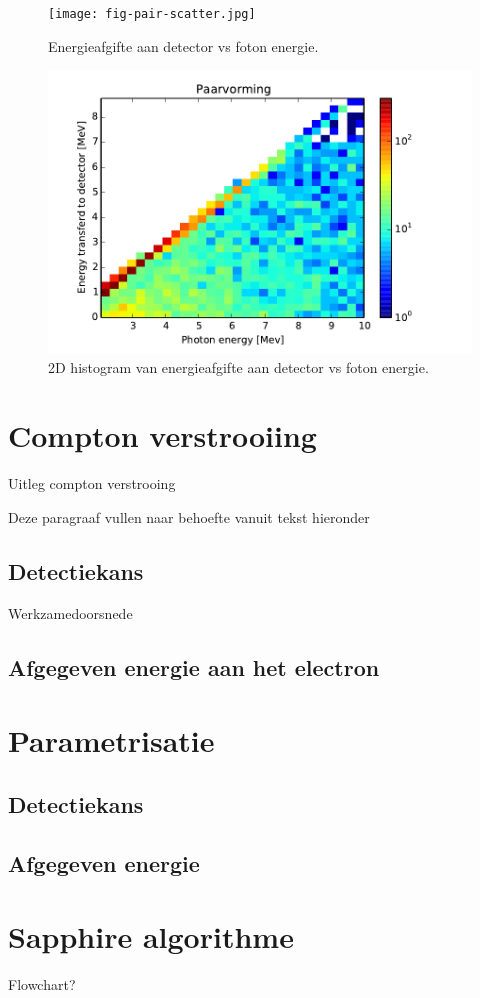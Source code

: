 \documentclass[a4paper,11pt]{article}
\begin{document}
\begin{figure}[t]
  \begin{center}
    \texttt{[image: fig-pair-scatter.jpg]}
    \caption{\label{fig:pair-scatter} Energieafgifte aan detector vs foton energie.}
  \end{center}
  \begin{center}
    \includegraphics{fig-pair-hist2d.pdf}
    \caption{\label{fig:pair-hist2d} 2D histogram van energieafgifte aan detector vs foton energie.}
  \end{center}
\end{figure}






\section{Compton verstrooiing}
Uitleg compton verstrooing

Deze paragraaf vullen naar behoefte vanuit tekst hieronder
\subsection{Detectiekans}
Werkzamedoorsnede
\subsection{Afgegeven energie aan het electron}

\section{Parametrisatie}
\subsection{Detectiekans}
\subsection{Afgegeven energie}

\section{Sapphire algorithme}
Flowchart?


{}

\end{document}
